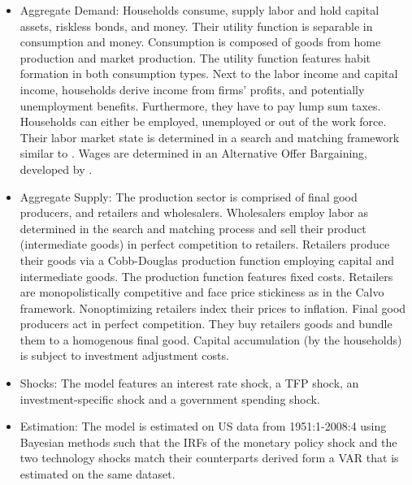 \documentclass[11pt,a4paper]{article}
\begin{document}
	\begin{itemize}
		\item Aggregate Demand: Households consume, supply labor and hold capital assets, riskless bonds, and money. Their utility function is separable in consumption and money. Consumption is composed of goods from home production and market production. The utility function features habit formation in both consumption types. Next to the labor income and capital income, households derive income from firms' profits, and potentially unemployment benefits. Furthermore, they have to pay lump sum taxes. Households can either be employed, unemployed or out of the work force. Their labor market state is determined in a search and matching framework similar to \cite{MortensenPissarides1994}. Wages are determined in an Alternative Offer Bargaining, developed by \cite{christiano2016unemployment}.
		
		\item Aggregate Supply: The production sector is comprised of final good producers, and retailers and wholesalers. Wholesalers employ labor as determined in the search and matching process and sell their product (intermediate goods) in perfect competition to retailers. Retailers produce their goods via a Cobb-Douglas production function employing capital and intermediate goods. The production function features fixed costs. Retailers are monopolistically competitive and face price stickiness as in the Calvo framework. Nonoptimizing retailers index their prices to inflation. Final good producers act in perfect competition. They buy retailers goods and bundle them to a homogenous final good. Capital accumulation (by the households) is subject to investment adjustment costs. 
		
		\item Shocks: The model features an interest rate shock, a TFP shock, an investment-specific shock and a government spending shock.
		
		\item Estimation: The model is estimated on US data from 1951:1-2008:4 using Bayesian methods such that the IRFs of the monetary policy shock and the two technology shocks match their counterparts derived form a VAR that is estimated on the same dataset.
	\end{itemize}
	
	
	
\end{document}
